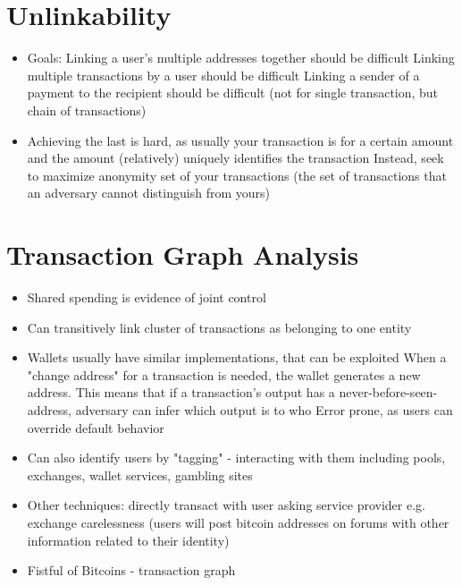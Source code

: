 \documentclass{article}
\begin{document}
\section{Unlinkability}
\begin{itemize}
\item Goals:
\subitem Linking a user's multiple addresses together should be difficult
\subitem Linking multiple transactions by a user should be difficult
\subitem Linking a sender of a payment to the recipient should be difficult (not for single transaction, but chain of transactions)
\item Achieving the last is hard, as usually your transaction is for a certain amount and the amount (relatively) uniquely identifies the transaction
\subitem Instead, seek to maximize anonymity set of your transactions (the set of transactions that an adversary cannot distinguish from yours)
\end{itemize}

\section{Transaction Graph Analysis}
\begin{itemize}
\item Shared spending is evidence of joint control
\item Can transitively link cluster of transactions as belonging to one entity
\item Wallets usually have similar implementations, that can be exploited
\subitem When a "change address" for a transaction is needed, the wallet generates a new address. This means that if a transaction's output has a never-before-seen-address, adversary can infer which output is to who
\subitem Error prone, as users can override default behavior
\item Can also identify users by "tagging" - interacting with them including pools, exchanges, wallet services, gambling sites
\item Other techniques:
\subitem directly transact with user
\subitem asking service provider e.g. exchange
\subitem carelessness (users will post bitcoin addresses on forums with other information related to their identity)
\item Fistful of Bitcoins - transaction graph
\end{itemize}
\end{document}
